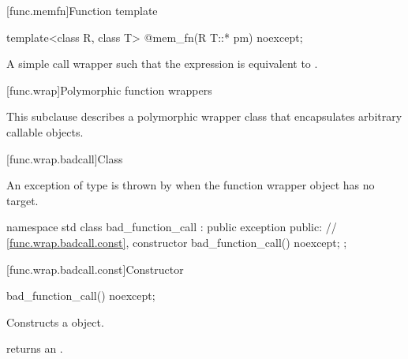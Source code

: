[func.memfn]{Function template }%

%
\begin{itemdecl}
template<class R, class T> @\unspec@ mem_fn(R T::* pm) noexcept;
\end{itemdecl}

\begin{itemdescr}
\pnum
\returns A simple call wrapper 
such that the expression  is equivalent
to .
\end{itemdescr}

[func.wrap]{Polymorphic function wrappers}%

\pnum
This subclause describes a polymorphic wrapper class that
encapsulates arbitrary callable objects.

[func.wrap.badcall]{Class }%
%

\pnum
An exception of type  is thrown by
when the function wrapper object has no target.

\begin{codeblock}
namespace std {
  class bad_function_call : public exception {
  public:
    // \ref{func.wrap.badcall.const}, constructor
    bad_function_call() noexcept;
  };
}
\end{codeblock}

[func.wrap.badcall.const]{Constructor}

%
%
\begin{itemdecl}
bad_function_call() noexcept;
\end{itemdecl}

\begin{itemdescr}
\pnum\effects Constructs a  object.
\end{itemdescr}

\begin{itemdescr}
\pnum\ensures  {} returns an
 \ntbs{}.
\end{itemdescr}

